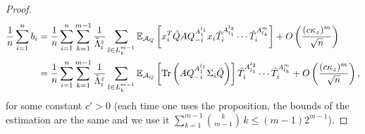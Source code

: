 \documentclass[a4papaer, titlepage]{book}
\begin{document}
\begin{proof}
  \begin{align*}
    \frac{1}{n} \sum_{i=1}^nb_i
    &=\frac{1}{n} \sum_{i=1}^n \sum_{k=1}^{m-1}\frac{1}{\tilde\Lambda_i^z}\sum_{l\in L_k^{m-1}}\mathbb{E}_{\mathcal A_Q}\left[ x_i^T\tilde Q  A Q_{-i}^{A_1^{l_1}}x_i\tilde T_i^{A^{l_2}_{l_1}}\cdots \tilde T_i^{A^{m}_{l_k}}\right] + O\left( \frac{(c\kappa_z)^{m}}{\sqrt n} \right)\\
    &=\frac{1}{n} \sum_{i=1}^n\sum_{k=1}^{m-1}\frac{1}{\tilde\Lambda_i^z}\sum_{l\in L_k^{m-1}}\mathbb{E}_{\mathcal A_Q}\left[ \operatorname{Tr} \left(  A Q_{-i}^{A_1^{l_1}}\Sigma_i\tilde Q\right)\right]\tilde T_i^{A^{l_2}_{l_1}}\cdots \tilde T_i^{A^{m}_{l_k}} + O\left( \frac{(c\kappa_z)^{m}}{\sqrt n} \right),
  \end{align*}
  for some constant $c'>0$ (each time one uses the proposition, the bounds of the estimation are the same and we use it $\sum_{k=1}^{m-1} \binom{k}{m-1} \, k \leq (m-1)2^{m-1}$).
  \end{proof}
\end{document}

